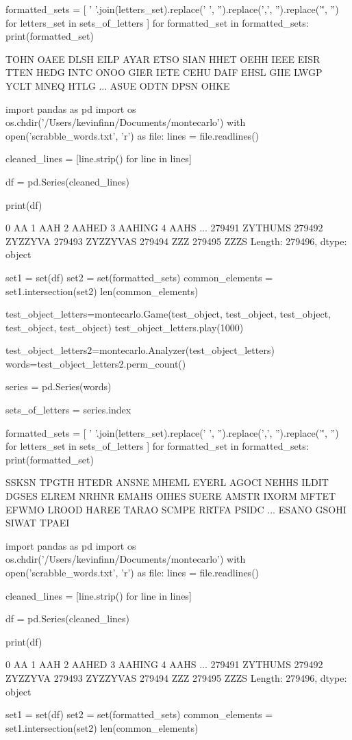 formatted_sets = [
    ' '.join(letters_set).replace(' ', '').replace(',', '').replace('\'', '') 
    for letters_set in sets_of_letters
]
for formatted_set in formatted_sets:
    print(formatted_set)
    
    TOHN
OAEE
DLSH
EILP
AYAR
ETSO
SIAN
HHET
OEHH
IEEE
EISR
TTEN
HEDG
INTC
ONOO
GIER
IETE
CEHU
DAIF
EHSL
GIIE
LWGP
YCLT
MNEQ
HTLG
...
ASUE
ODTN
DPSN
OHKE

import pandas as pd
import os
os.chdir('/Users/kevinfinn/Documents/montecarlo')
with open('scrabble_words.txt', 'r') as file:
    lines = file.readlines()

cleaned_lines = [line.strip() for line in lines]

df = pd.Series(cleaned_lines)

print(df)

0               AA
1              AAH
2            AAHED
3           AAHING
4             AAHS
            ...   
279491     ZYTHUMS
279492     ZYZZYVA
279493    ZYZZYVAS
279494         ZZZ
279495        ZZZS
Length: 279496, dtype: object

set1 = set(df)
set2 = set(formatted_sets)
common_elements = set1.intersection(set2)
len(common_elements)

test_object_letters=montecarlo.Game(test_object, test_object, test_object, test_object, test_object)
test_object_letters.play(1000)

test_object_letters2=montecarlo.Analyzer(test_object_letters)
words=test_object_letters2.perm_count()

series = pd.Series(words)

sets_of_letters = series.index

formatted_sets = [
    ' '.join(letters_set).replace(' ', '').replace(',', '').replace('\'', '') 
    for letters_set in sets_of_letters
]
for formatted_set in formatted_sets:
    print(formatted_set)
    
    SSKSN
TPGTH
HTEDR
ANSNE
MHEML
EYERL
AGOCI
NEHHS
ILDIT
DGSES
ELREM
NRHNR
EMAHS
OIHES
SUERE
AMSTR
IXORM
MFTET
EFWMO
LROOD
HAREE
TARAO
SCMPE
RRTFA
PSIDC
...
ESANO
GSOHI
SIWAT
TPAEI

import pandas as pd
import os
os.chdir('/Users/kevinfinn/Documents/montecarlo')
with open('scrabble_words.txt', 'r') as file:
    lines = file.readlines()

cleaned_lines = [line.strip() for line in lines]

df = pd.Series(cleaned_lines)

print(df)

0               AA
1              AAH
2            AAHED
3           AAHING
4             AAHS
            ...   
279491     ZYTHUMS
279492     ZYZZYVA
279493    ZYZZYVAS
279494         ZZZ
279495        ZZZS
Length: 279496, dtype: object

set1 = set(df)
set2 = set(formatted_sets)
common_elements = set1.intersection(set2)
len(common_elements)